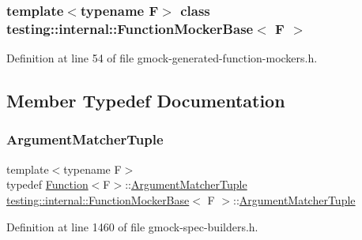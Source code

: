 \subsubsection*{template$<$typename F$>$\newline
class testing\+::internal\+::\+Function\+Mocker\+Base$<$ F $>$}



Definition at line 54 of file gmock-\/generated-\/function-\/mockers.\+h.



\subsection{Member Typedef Documentation}
\mbox{\label{classtesting_1_1internal_1_1FunctionMockerBase_ab790bcb1dcf57fa6659365386723ae5a}} 
\subsubsection{\texorpdfstring{Argument\+Matcher\+Tuple}{ArgumentMatcherTuple}}
{\footnotesize\ttfamily template$<$typename F$>$ \\
typedef \hyperlink{structtesting_1_1internal_1_1Function}{Function}$<$F$>$\+::\hyperlink{classtesting_1_1internal_1_1FunctionMockerBase_ab790bcb1dcf57fa6659365386723ae5a}{Argument\+Matcher\+Tuple} \hyperlink{classtesting_1_1internal_1_1FunctionMockerBase}{testing\+::internal\+::\+Function\+Mocker\+Base}$<$ F $>$\+::\hyperlink{classtesting_1_1internal_1_1FunctionMockerBase_ab790bcb1dcf57fa6659365386723ae5a}{Argument\+Matcher\+Tuple}}



Definition at line 1460 of file gmock-\/spec-\/builders.\+h.

\mbox{\label{classtesting_1_1internal_1_1FunctionMockerBase_a336432a07e544af4ffb8103603471ca3}} 
